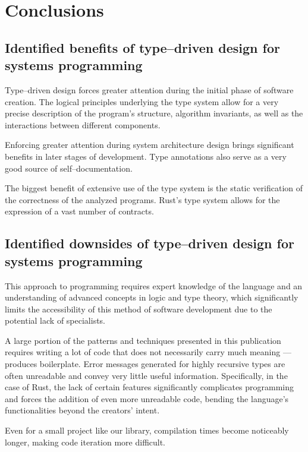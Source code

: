 \chapter{Conclusions}

\section{Identified benefits of type--driven design for systems programming}

Type--driven design forces greater attention during the initial phase of software creation. 
The logical principles underlying the type system allow for a very precise description of the program's structure, algorithm invariants, as well as the interactions between different components.

Enforcing greater attention during system architecture design brings significant benefits in later stages of development. Type annotations also serve as a very good source of self--documentation.

The biggest benefit of extensive use of the type system is the static verification of the correctness of the analyzed programs. 
Rust's type system allows for the expression of a vast number of contracts.

\section{Identified downsides of type--driven design for systems programming}

This approach to programming requires expert knowledge of the language and an understanding of advanced concepts in logic and type theory, which significantly limits the accessibility of this method of software development due to the potential lack of specialists.

A large portion of the patterns and techniques presented in this publication requires writing a lot of code that does not necessarily carry much meaning --- produces boilerplate. 
Error messages generated for highly recursive types are often unreadable and convey very little useful information.
Specifically, in the case of Rust, the lack of certain features significantly complicates programming and forces the addition of even more unreadable code, 
bending the language's functionalities beyond the creators' intent.

Even for a small project like our library, compilation times become noticeably longer, making code iteration more difficult.

